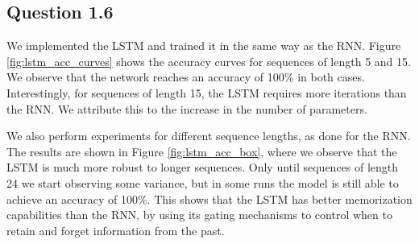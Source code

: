 \documentclass{article}
\begin{document}
\subsection*{Question 1.6}

We implemented the LSTM and trained it in the same way as the RNN. Figure \ref{fig:lstm_acc_curves} shows the accuracy curves for sequences of length 5 and 15. We observe that the network reaches an accuracy of 100\% in both cases. Interestingly, for sequences of length 15, the LSTM requires more iterations than the RNN. We attribute this to the increase in the number of parameters.

We also perform experiments for different sequence lengths, as done for the RNN. The results are shown in Figure \ref{fig:lstm_acc_box}, where we observe that the LSTM is much more robust to longer sequences. Only until sequences of length 24 we start observing some variance, but in some runs the model is still able to achieve an accuracy of 100\%. This shows that the LSTM has better memorization capabilities than the RNN, by using its gating mechanisms to control when to retain and forget information from the past.
\end{document}
